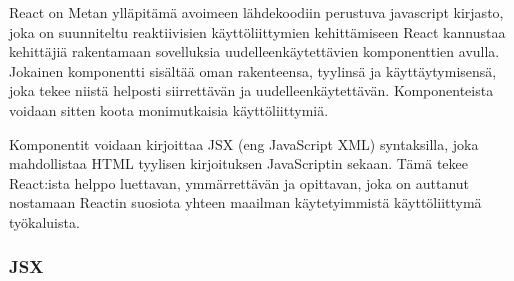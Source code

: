 
















React on Metan ylläpitämä avoimeen lähdekoodiin perustuva javascript kirjasto,
joka on suunniteltu reaktiivisien käyttöliittymien kehittämiseen
React kannustaa kehittäjiä rakentamaan sovelluksia uudelleenkäytettävien komponenttien avulla.
Jokainen komponentti sisältää oman rakenteensa, tyylinsä ja käyttäytymisensä, joka tekee niistä helposti siirrettävän ja uudelleenkäytettävän.
Komponenteista voidaan sitten koota monimutkaisia käyttöliittymiä. 
\medskip


Komponentit voidaan kirjoittaa JSX (eng JavaScript XML) syntaksilla, joka mahdollistaa HTML tyylisen kirjoituksen JavaScriptin sekaan.
Tämä tekee React:ista helppo luettavan, ymmärrettävän ja opittavan,
joka on auttanut nostamaan Reactin suosiota yhteen maailman käytetyimmistä käyttöliittymä työkaluista.
\medskip









\subsubsection{JSX}








